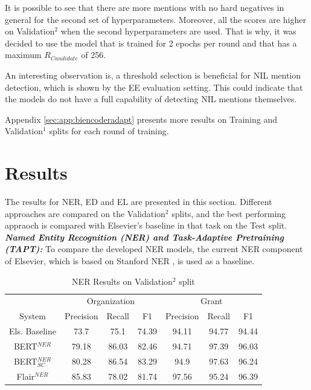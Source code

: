 \documentclass{report}
\theoremstyle{definition}
\theoremstyle{remark}
\begin{document}
It is possible to see that there are more mentions with no hard negatives in general for the second set of hyperparameters. Moreover, all the scores are higher on Validation$^2$ when the second hyperparameters are used. That is why, it was decided to use the model that is trained for 2 epochs per round and that has a maximum $R_{Candidate}$ of 256.

An interesting observation is, a threshold selection is beneficial for NIL mention detection, which is shown by the EE evaluation setting. This could indicate that the models do not have a full capability of detecting NIL mentions themselves. 

Appendix \ref{sec:app:biencoderadapt} presents more results on Training and Validation$^1$ splits for each round of training.

\section{Results}
\label{sec:EvalResults}
The results for NER, ED and EL are presented in this section. Different approaches are compared on the Validation$^2$ splits, and the best performing appraoch is compared with Elsevier's baseline in that task on the Test split.
\newline
\newline
\textit{\textbf{Named Entity Recognition (NER) and Task-Adaptive Pretraining (TAPT):}}
To compare the developed NER models, the current NER component of Elsevier, which is based on Stanford NER \cite{stanfordNER},  is used as a baseline.

\begin{table}
    \centering
    \begin{tabular}{c| c c c| c c c}
    &\multicolumn{3}{c|}{Organization}&\multicolumn{3}{c}{Grant} \\
    System&Precision&Recall&F1&Precision&Recall&F1\\
    \hline
    Els. Baseline & 73.7&	75.1&74.39&94.11&94.77&94.44
 \\[0.7ex]
    BERT$^{NER}$ & 79.18&86.03&82.46&94.71&97.39&96.03
\\[0.7ex]
    BERT$^{NER}_{SC}$ & 80.28&86.54&83.29&94.9	&97.63&96.24
  \\[0.7ex]
    Flair$^{NER}$& 85.83&78.02&81.74&97.56&95.24&96.39
 \\[0.7ex]
    \end{tabular}
    \caption{NER Results on Validation$^2$ split}
    \label{tab:all_ner_results}
\end{table}
\end{document}
